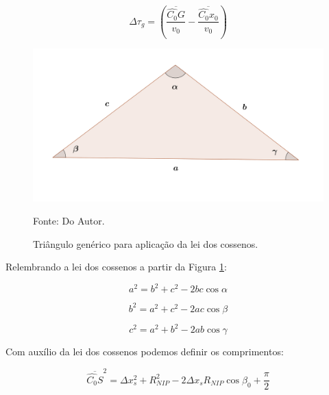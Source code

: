\documentclass[a4paper, 12pt]{article}
\begin{document}
\begin{equation}
\label{eq:1.6}
\Delta \tau_g = \left( \frac{\overline{\hat{C_0}G}}{v_0} - \frac{\overline{\hat{C_0}x_0}}{v_0} \right)
\end{equation}

\begin{figure}[H]
\caption{Triângulo genérico para aplicação da lei dos cossenos.}
\begin{center}
\includegraphics[scale=0.8]{images/leiCossenos.png}
\vspace{-0.3cm}
\end{center}
\begin{center}
 Fonte: Do Autor.
\end{center}
\label{fig:1.2}
\end{figure}

Relembrando a lei dos cossenos a partir da Figura \ref{fig:1.2}:

\begin{equation}
 \label{eq:1.7}
 a^2 = b^2 + c^2 - 2 b c \cos{\alpha}
\end{equation}

\begin{equation}
 \label{eq:1.8}
 b^2 = a^2 + c^2 - 2 a c \cos{\beta}
\end{equation}

\begin{equation}
 \label{eq:1.9}
 c^2 = a^2 + b^2 - 2 a b \cos{\gamma}
\end{equation}

Com auxílio da lei dos cossenos podemos definir os comprimentos:

\begin{equation}
 \label{eq:1.10}
 \overline{\hat{C_0}S}^2 = \Delta x_{s}^2 + R_{NIP}^2 - 2 \Delta x_s R_{NIP} \cos{\beta_0 + \frac{\pi}{2}}
\end{equation}
\end{document}
